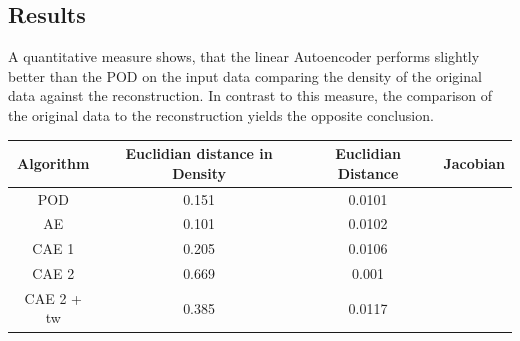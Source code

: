 \documentclass[12pt, a4paper]{article}
\begin{document}
\subsection{Results}
A quantitative measure shows, that the linear Autoencoder performs slightly better than the POD on the input data comparing the density of the original data against the reconstruction. In contrast to this measure, the comparison of the original data to the reconstruction yields the opposite conclusion. 
\begin{center}
\begin{tabular}{ |c|c|c|c| } 
	\hline
	Algorithm & Euclidian distance in Density & Euclidian Distance & Jacobian \\ \hline
	POD & 0.151 & 0.0101 &\\ 
	AE & 0.101 & 0.0102 &\\ 
	CAE 1 & 0.205 & 0.0106 & \\
	CAE 2 & 0.669 & 0.001 & \\
	CAE 2 + tw & 0.385 & 0.0117 & \\
	\hline
\end{tabular}
\end{center}
\end{document}
